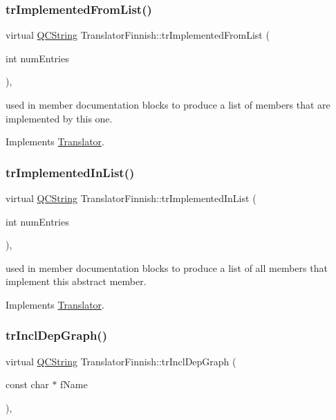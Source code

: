 \subsubsection{\texorpdfstring{trImplementedFromList()}{trImplementedFromList()}}
{\footnotesize\ttfamily virtual \mbox{\hyperlink{class_q_c_string}{Q\+C\+String}} Translator\+Finnish\+::tr\+Implemented\+From\+List (\begin{DoxyParamCaption}\item[{int}]{num\+Entries }\end{DoxyParamCaption})\hspace{0.3cm}{\ttfamily [inline]}, {\ttfamily [virtual]}}

used in member documentation blocks to produce a list of members that are implemented by this one. 

Implements \mbox{\hyperlink{class_translator}{Translator}}.

\mbox{\label{class_translator_finnish_ad7f9bc90e1a430f20b280ea9dc73b608}} 
\subsubsection{\texorpdfstring{trImplementedInList()}{trImplementedInList()}}
{\footnotesize\ttfamily virtual \mbox{\hyperlink{class_q_c_string}{Q\+C\+String}} Translator\+Finnish\+::tr\+Implemented\+In\+List (\begin{DoxyParamCaption}\item[{int}]{num\+Entries }\end{DoxyParamCaption})\hspace{0.3cm}{\ttfamily [inline]}, {\ttfamily [virtual]}}

used in member documentation blocks to produce a list of all members that implement this abstract member. 

Implements \mbox{\hyperlink{class_translator}{Translator}}.

\mbox{\label{class_translator_finnish_aa33af9a5e616ce188a3d47dc6412ca99}} 
\subsubsection{\texorpdfstring{trInclDepGraph()}{trInclDepGraph()}}
{\footnotesize\ttfamily virtual \mbox{\hyperlink{class_q_c_string}{Q\+C\+String}} Translator\+Finnish\+::tr\+Incl\+Dep\+Graph (\begin{DoxyParamCaption}\item[{const char $\ast$}]{f\+Name }\end{DoxyParamCaption})\hspace{0.3cm}{\ttfamily [inline]}, {\ttfamily [virtual]}}

